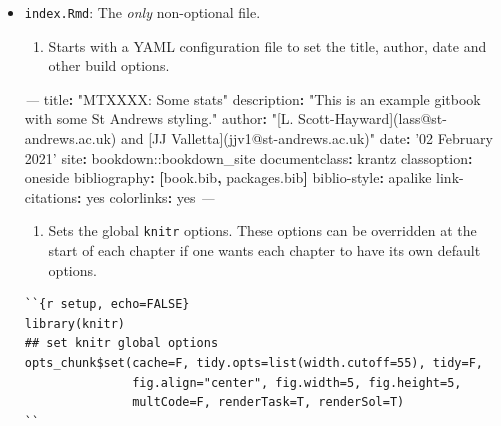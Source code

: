 \documentclass[
  oneside]{krantz}
\newenvironment{Shaded}{\begin{snugshade}}{\end{snugshade}}
\newcommand{\AttributeTok}[1]{\textcolor[rgb]{0.77,0.63,0.00}{#1}}
\newcommand{\CharTok}[1]{\textcolor[rgb]{0.31,0.60,0.02}{#1}}
\newcommand{\FunctionTok}[1]{\textcolor[rgb]{0.00,0.00,0.00}{#1}}
\newcommand{\KeywordTok}[1]{\textcolor[rgb]{0.13,0.29,0.53}{\textbf{#1}}}
\newcommand{\PreprocessorTok}[1]{\textcolor[rgb]{0.56,0.35,0.01}{\textit{#1}}}
\newcommand{\StringTok}[1]{\textcolor[rgb]{0.31,0.60,0.02}{#1}}
\providecommand{\tightlist}{%
  \setlength{\itemsep}{0pt}\setlength{\parskip}{0pt}}
\theoremstyle{definition}
\theoremstyle{definition}
\theoremstyle{definition}
\theoremstyle{remark}
\begin{document}
\begin{itemize}
\item
  \texttt{index.Rmd}: The \emph{only} non-optional file.

  \begin{enumerate}
  \def\labelenumi{\arabic{enumi}.}
  \tightlist
  \item
    Starts with a YAML configuration file to set the title, author, date and other build options.
  \end{enumerate}

\begin{Shaded}
\begin{Highlighting}[]
\PreprocessorTok{--- }
\FunctionTok{title}\KeywordTok{:}\AttributeTok{ }\StringTok{"MTXXXX: Some stats"}
\FunctionTok{description}\KeywordTok{:}\AttributeTok{ }\StringTok{"This is an example gitbook with some St Andrews styling."}
\FunctionTok{author}\KeywordTok{:}\AttributeTok{ }\StringTok{"[L. Scott-Hayward](lass@st-andrews.ac.uk) and [JJ Valletta](jjv1@st-andrews.ac.uk)"}
\FunctionTok{date}\KeywordTok{:}\AttributeTok{ }\StringTok{'02 February 2021'}
\FunctionTok{site}\KeywordTok{:}\AttributeTok{ bookdown::bookdown_site}
\FunctionTok{documentclass}\KeywordTok{:}\AttributeTok{ krantz}
\FunctionTok{classoption}\KeywordTok{:}\AttributeTok{ oneside}
\FunctionTok{bibliography}\KeywordTok{:}\AttributeTok{ }\KeywordTok{[}\AttributeTok{book.bib}\KeywordTok{,}\AttributeTok{ packages.bib}\KeywordTok{]}
\FunctionTok{biblio-style}\KeywordTok{:}\AttributeTok{ apalike}
\FunctionTok{link-citations}\KeywordTok{:}\AttributeTok{ }\CharTok{yes}
\FunctionTok{colorlinks}\KeywordTok{:}\AttributeTok{ }\CharTok{yes}
\PreprocessorTok{---}
\end{Highlighting}
\end{Shaded}

  \begin{enumerate}
  \def\labelenumi{\arabic{enumi}.}
  \setcounter{enumi}{1}
  \tightlist
  \item
    Sets the global \texttt{knitr} options. These options can be overridden at the start of each chapter if one wants each chapter to have its own default options.
  \end{enumerate}

\begin{verbatim}
``{r setup, echo=FALSE}
library(knitr)
## set knitr global options
opts_chunk$set(cache=F, tidy.opts=list(width.cutoff=55), tidy=F, 
               fig.align="center", fig.width=5, fig.height=5,
               multCode=F, renderTask=T, renderSol=T)
``
\end{verbatim}


\end{itemize}
\end{document}
